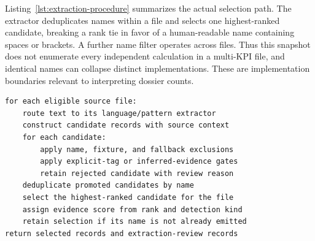 \documentclass[a4paper,fleqn]{cas-dc}
\begin{document}
Listing~\ref{lst:extraction-procedure} summarizes the actual selection path. The extractor deduplicates names within a file and selects one highest-ranked candidate, breaking a rank tie in favor of a human-readable name containing spaces or brackets. A further name filter operates across files. Thus this snapshot does not enumerate every independent calculation in a multi-KPI file, and identical names can collapse distinct implementations. These are implementation boundaries relevant to interpreting dossier counts.

\begin{lstlisting}[language={},numbers=none,basicstyle=\ttfamily\scriptsize,caption={Source-faithful summary of the frozen candidate-selection procedure.},label={lst:extraction-procedure}]
for each eligible source file:
    route text to its language/pattern extractor
    construct candidate records with source context
    for each candidate:
        apply name, fixture, and fallback exclusions
        apply explicit-tag or inferred-evidence gates
        retain rejected candidate with review reason
    deduplicate promoted candidates by name
    select the highest-ranked candidate for the file
    assign evidence score from rank and detection kind
    retain selection if its name is not already emitted
return selected records and extraction-review records
\end{lstlisting}
\end{document}
